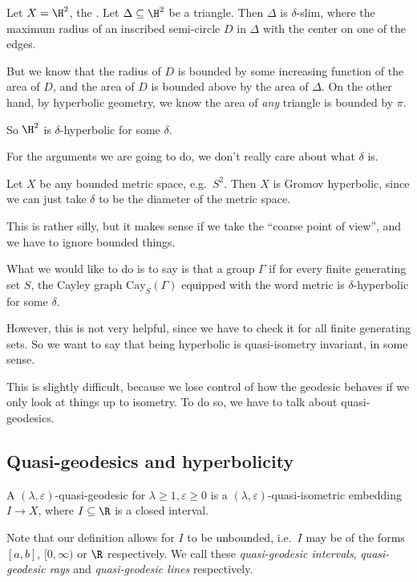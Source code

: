 \documentclass[a4paper]{article}
\newcommand\Cay{\mathrm{Cay}}
\begin{document}
\begin{eg}
  Let $X = \H^2$, the . Let $\Delta \subseteq \H^2$ be a triangle. Then $\Delta$ is $\delta$-slim, where the maximum radius of an inscribed semi-circle $D$ in $\Delta$ with the center on one of the edges.

  But we know that the radius of $D$ is bounded by some increasing function of the area of $D$, and the area of $D$ is bounded above by the area of $\Delta$. On the other hand, by hyperbolic geometry, we know the area of \emph{any} triangle is bounded by $\pi$.

  So $\H^2$ is $\delta$-hyperbolic for some $\delta$.
\end{eg}
For the arguments we are going to do, we don't really care about what $\delta$ is.

\begin{eg}
  Let $X$ be any bounded metric space, e.g.\ $S^2$. Then $X$ is Gromov hyperbolic, since we can just take $\delta$ to be the diameter of the metric space.
\end{eg}
This is rather silly, but it makes sense if we take the ``coarse point of view'', and we have to ignore bounded things.

What we would like to do is to say is that a group $\Gamma$ if for every finite generating set $S$, the Cayley graph $\Cay_S(\Gamma)$ equipped with the word metric is $\delta$-hyperbolic for some $\delta$.

However, this is not very helpful, since we have to check it for all finite generating sets. So we want to say that being hyperbolic is quasi-isometry invariant, in some sense.

This is slightly difficult, because we lose control of how the geodesic behaves if we only look at things up to isometry. To do so, we have to talk about quasi-geodesics.

\subsection{Quasi-geodesics and hyperbolicity}
\begin{defi}
  A $(\lambda, \varepsilon)$-quasi-geodesic for $\lambda \geq 1, \varepsilon \geq 0$ is a $(\lambda, \varepsilon)$-quasi-isometric embedding $I \to X$, where $I \subseteq \R$ is a closed interval.
\end{defi}
Note that our definition allows for $I$ to be unbounded, i.e.\ $I$ may be of the forms $[a, b]$, $[0, \infty)$ or $\R$ respectively. We call these \emph{quasi-geodesic intervals}, \emph{quasi-geodesic rays} and \emph{quasi-geodesic lines} respectively.
\end{document}
